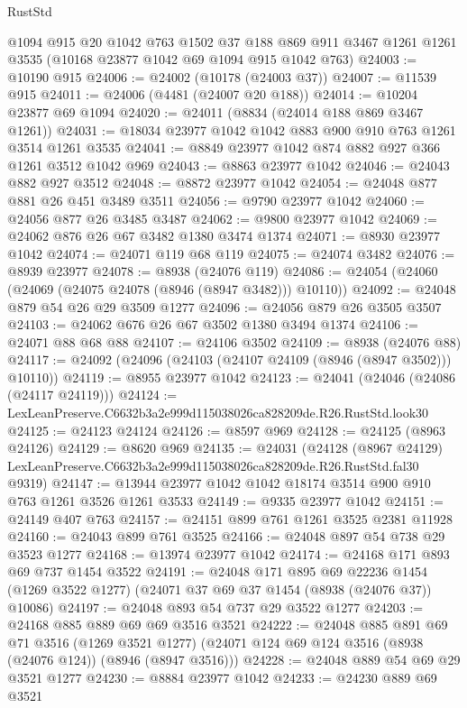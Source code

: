 \begin{lexlean}{RustStd}
\begin{coremodule}
    @1094
    @915
    @20
    @1042
    @763
    @1502
    @37
    @188
    @869
    @911
    @3467
    @1261
    @1261
    @3535
    (@10168 @23877 @1042 @69 @1094 @915 @1042 @763)
@24003 := @10190 @915
@24006 := @24002 (@10178 (@24003 @37))
@24007 := @11539 @915
@24011 := @24006 (@4481 (@24007 @20 @188))
@24014 := @10204 @23877 @69 @1094
@24020 := @24011 (@8834 (@24014 @188 @869 @3467 @1261))
@24031 := @18034 @23977 @1042 @1042 @883 @900 @910 @763 @1261 @3514 @1261 @3535
@24041 := @8849 @23977 @1042 @874 @882 @927 @366 @1261 @3512 @1042 @969
@24043 := @8863 @23977 @1042
@24046 := @24043 @882 @927 @3512
@24048 := @8872 @23977 @1042
@24054 := @24048 @877 @881 @26 @451 @3489 @3511
@24056 := @9790 @23977 @1042
@24060 := @24056 @877 @26 @3485 @3487
@24062 := @9800 @23977 @1042
@24069 := @24062 @876 @26 @67 @3482 @1380 @3474 @1374
@24071 := @8930 @23977 @1042
@24074 := @24071 @119 @68 @119
@24075 := @24074 @3482
@24076 := @8939 @23977
@24078 := @8938 (@24076 @119)
@24086 := @24054 (@24060 (@24069 (@24075 @24078 (@8946 (@8947 @3482))) @10110))
@24092 := @24048 @879 @54 @26 @29 @3509 @1277
@24096 := @24056 @879 @26 @3505 @3507
@24103 := @24062 @676 @26 @67 @3502 @1380 @3494 @1374
@24106 := @24071 @88 @68 @88
@24107 := @24106 @3502
@24109 := @8938 (@24076 @88)
@24117 := @24092 (@24096 (@24103 (@24107 @24109 (@8946 (@8947 @3502))) @10110))
@24119 := @8955 @23977 @1042
@24123 := @24041 (@24046 (@24086 (@24117 @24119)))
@24124 := LexLeanPreserve.C6632b3a2e999d115038026ca828209de.R26.RustStd.look30
@24125 := @24123 @24124
@24126 := @8597 @969
@24128 := @24125 (@8963 @24126)
@24129 := @8620 @969
@24135 := @24031
    (@24128
      (@8967 @24129)
      LexLeanPreserve.C6632b3a2e999d115038026ca828209de.R26.RustStd.fal30
      @9319)
@24147 := @13944 @23977 @1042 @1042 @18174 @3514 @900 @910 @763 @1261 @3526 @1261 @3533
@24149 := @9335 @23977 @1042
@24151 := @24149 @407 @763
@24157 := @24151 @899 @761 @1261 @3525 @2381 @11928
@24160 := @24043 @899 @761 @3525
@24166 := @24048 @897 @54 @738 @29 @3523 @1277
@24168 := @13974 @23977 @1042
@24174 := @24168 @171 @893 @69 @737 @1454 @3522
@24191 := @24048
    @171
    @895
    @69
    @22236
    @1454
    (@1269 @3522 @1277)
    (@24071 @37 @69 @37 @1454 (@8938 (@24076 @37)) @10086)
@24197 := @24048 @893 @54 @737 @29 @3522 @1277
@24203 := @24168 @885 @889 @69 @69 @3516 @3521
@24222 := @24048
    @885
    @891
    @69
    @71
    @3516
    (@1269 @3521 @1277)
    (@24071 @124 @69 @124 @3516 (@8938 (@24076 @124)) (@8946 (@8947 @3516)))
@24228 := @24048 @889 @54 @69 @29 @3521 @1277
@24230 := @8884 @23977 @1042
@24233 := @24230 @889 @69 @3521

\end{coremodule}
\end{lexlean}
